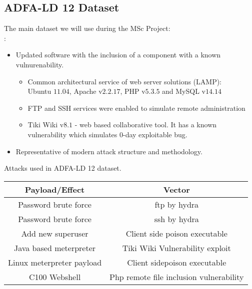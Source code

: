 \documentclass{beamer}
\begin{document}
\subsection{ADFA-LD 12 Dataset}
\frame
{
The main dataset we will use during the MSc Project:\\
:
\begin{itemize}
\item Updated software with the inclusion of a component with a known vulnurenability.\\
\begin{itemize}
\item  Common architectural service of web server solutions (LAMP):\\
Ubuntu $11.04$, Apache v$2.2.17$,  PHP v$5.3.5$ and MySQL v$14.14$
\item FTP and SSH services were enabled to simulate remote administration
\item Tiki Wiki v$8.1$ - web based collaborative tool. It has a known vulnerability which simulates 0-day exploitable bug.
\end{itemize}

\item Representative of modern attack structure and methodology.

\end{itemize}
}

\begin{frame}{Attacks used in ADFA-LD 12 dataset.}
\begin{table}
\begin{tabular}{|c|c|}
\hline
\textbf{Payload/Effect} & \textbf{Vector} \\ \hline 
Password brute force  & ftp by hydra \\ \hline
Password brute force & ssh by hydra \\ \hline
Add new superuser & Client side poison executable\\ \hline
Java based meterpreter & Tiki Wiki Vulnerability exploit\\ \hline
Linux meterpreter payload & Client sidepoison executable\\ \hline
C100 Webshell & Php remote file inclusion vulnerability \\ \hline
\end{tabular}
\label{tab2}
\end{table}
\end{frame}
\end{document}
